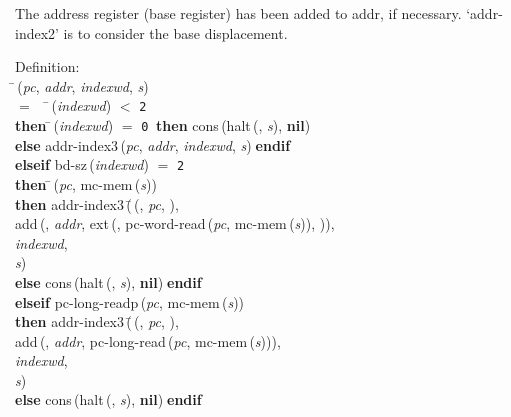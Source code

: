  The address register (base register) has been added to addr, if necessary.
 `addr-index2' is to consider the base displacement.
\begin{tabbing}{\sc Definition}: \\  
\=\,({\it{pc\/}}, {\it{addr\/}}, {\it{indexwd\/}}, {\it{s\/}}) \\ 
$=$$\;\;\;\;$\=\,({\it{indexwd\/}}) $<$ {\tt{2}} \\ 
{\bf then }\=\,({\it{indexwd\/}}) $=$ {\tt{0}}$\;\;${\bf then }{\rm{cons}}\,({\rm{halt}}\,({}, {\it{s\/}}), {\bf{nil}}) \\ 
{\bf else }{\rm{addr-index3}}\,({\it{pc\/}}, {\it{addr\/}}, {\it{indexwd\/}}, {\it{s\/}})$\;${\bf  endif}\- \\ 
{\bf elseif }{\rm{bd-sz}}\,({\it{indexwd\/}}) $=$ {\tt{2}} \\ 
{\bf then }\=\,({\it{pc\/}}, {\rm{mc-mem}}\,({\it{s\/}})) \\ 
{\bf then }{\rm{addr-index3}}\,(\=\,({}, {\it{pc\/}}, {}), \\ 
{\rm{add}}\,({}, {\it{addr\/}}, {\rm{ext}}\,({}, {\rm{pc-word-read}}\,({\it{pc\/}}, {\rm{mc-mem}}\,({\it{s\/}})), {})), \\ 
{\it{indexwd\/}}, \\ 
{\it{s\/}})\- \\ 
{\bf else }{\rm{cons}}\,({\rm{halt}}\,({}, {\it{s\/}}), {\bf{nil}})$\;${\bf  endif}\- \\ 
{\bf elseif }{\rm{pc-long-readp}}\,({\it{pc\/}}, {\rm{mc-mem}}\,({\it{s\/}})) \\ 
{\bf then }{\rm{addr-index3}}\,(\=\,({}, {\it{pc\/}}, {}), \\ 
{\rm{add}}\,({}, {\it{addr\/}}, {\rm{pc-long-read}}\,({\it{pc\/}}, {\rm{mc-mem}}\,({\it{s\/}}))), \\ 
{\it{indexwd\/}}, \\ 
{\it{s\/}})\- \\ 
{\bf else }{\rm{cons}}\,({\rm{halt}}\,({}, {\it{s\/}}), {\bf{nil}})$\;${\bf  endif}\-\-
\end{tabbing}


